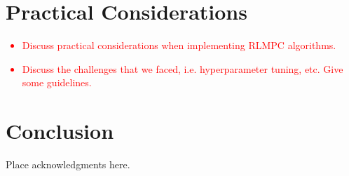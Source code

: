 \documentclass{ifacconf}
\begin{document}
\section{Practical Considerations}

\textcolor{red}{
   \begin{itemize}
      \item Discuss practical considerations when implementing RLMPC algorithms.
      \item Discuss the challenges that we faced, i.e. hyperparameter tuning, etc. Give some guidelines.
   \end{itemize}
}

\section{Conclusion}

\begin{ack}
   Place acknowledgments here.
\end{ack}


\end{document}
